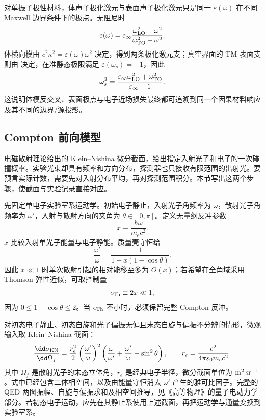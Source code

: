 



对单振子极性材料，体声子极化激元与表面声子极化激元只是同一 $\varepsilon(\omega)$ 在不同 Maxwell 边界条件下的极点。无阻尼时
\begin{equation*}
\varepsilon(\omega)=\varepsilon_\infty
\frac{\omega_{\rm LO}^2-\omega^2}{\omega_{\rm TO}^2-\omega^2}.
\end{equation*}
体横向模由 $c^2\kappa^2=\varepsilon(\omega)\omega^2$ 决定，得到两条极化激元支；真空界面的 TM 表面支则由 决定，在准静态极限满足 $\varepsilon(\omega_s)=-1$，因此
\begin{equation*}
\omega_s^2
=\frac{\varepsilon_\infty\omega_{\rm LO}^2+\omega_{\rm TO}^2}
{\varepsilon_\infty+1}.
\end{equation*}
这说明体模反交叉、表面极点与电子近场损失最终都可追溯到同一个因果材料响应及其不同的边界/源投影。




\subsection{Compton 前向模型}

电磁散射理论给出的 Klein--Nishina 微分截面，给出指定入射光子和电子的一次碰撞概率。实验光束却具有频率和方向分布，探测器也只接收有限范围的出射光。要预言实际计数，需要先对入射分布平均，再对探测范围积分。本节写出这两个步骤，使截面与实验记录直接对应。

先固定单电子实验室系运动学。初始电子静止，入射光子角频率为 $\omega$，散射光子角频率为 $\omega'$，入射与散射方向的夹角为 $\theta\in[0,\pi]$。定义无量纲反冲参数
\begin{equation*}
x\equiv\frac{\hbar\omega}{m_{\mathrm e} c^2}.
\end{equation*}
$x$ 比较入射单光子能量与电子静能。质量壳守恒给
\begin{equation*}
\frac{\omega'}{\omega}
=\frac{1}{1+x(1-\cos\theta)}.
\end{equation*}
因此 $x\ll1$ 时单次散射引起的相对能移至多为 $O(x)$；若希望在全角域采用 Thomson 弹性近似，可取控制量
\begin{equation*}
\epsilon_{\rm Th}\equiv2x\ll1,
\end{equation*}
因为 $0\le1-\cos\theta\le2$。当 $\epsilon_{\rm Th}$ 不小时，必须保留完整 Compton 反冲。

对初态电子静止、初态自旋和光子偏振无偏且末态自旋与偏振不分辨的情形，微观输入取 Klein--Nishina 截面：
\begin{equation}
\frac{\dd\sigma_{\rm KN}}{\dd\Omega_f}
=\frac{r_e^2}{2}\left(\frac{\omega'}{\omega}\right)^2
\left(\frac{\omega}{\omega'}+\frac{\omega'}{\omega}-\sin^2\theta\right),
\qquad r_e=\frac{e^2}{4\pi\varepsilon_0m_{\mathrm e}c^2}.
\label{eq:feqo-compton-microscopic-input}
\end{equation}
其中 $\Omega_f$ 是散射光子的末态立体角，$r_e$ 是经典电子半径，微分截面单位为 ${\rm m^2\,sr^{-1}}$。式中已经包含二体相空间，以及由能量守恒消去 $\omega'$ 产生的雅可比因子。完整的 QED 两图振幅、自旋与偏振求和及相空间推导，见《高等物理》的量子电动力学部分。若初态电子运动，应先在其静止系使用上述截面，再把运动学与通量变换到实验室系。

